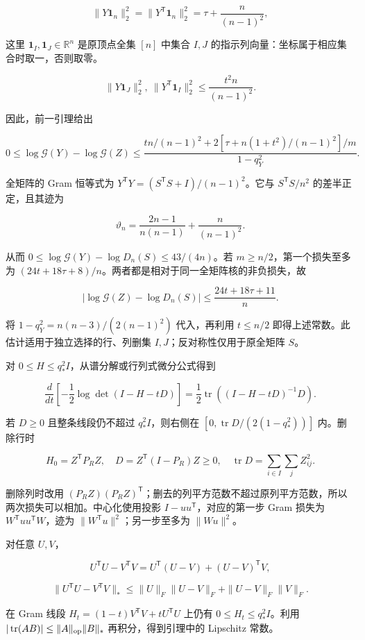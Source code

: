 \documentclass[11pt,a4paper]{article}
\begin{document}
\[
\|Y\mathbf 1_n\|_2^2=\|Y^{\mathsf T}\mathbf 1_n\|_2^2=\tau+\frac n{(n-1)^2},
\]

这里 \(\mathbf1_I,\mathbf1_J\in\mathbb R^n\) 是原顶点全集 \([n]\) 中集合 \(I,J\) 的指示列向量：坐标属于相应集合时取一，否则取零。

\[
\|Y\mathbf 1_J\|_2^2,\ \|Y^{\mathsf T}\mathbf 1_I\|_2^2\le\frac{t^2n}{(n-1)^2}.
\]

因此，前一引理给出

\[
0\le\log\mathcal G(Y)-\log\mathcal G(Z)\le\frac{t n/(n-1)^2+2[\tau+n(1+t^2)/(n-1)^2]/m}{1-q_Y^2}.
\]

全矩阵的 Gram 恒等式为 \(Y^{\mathsf T}Y=(S^{\mathsf T}S+I)/(n-1)^2\)。它与 \(S^{\mathsf T}S/n^2\) 的差半正定，且其迹为

\[
\vartheta_n=\frac{2n-1}{n(n-1)}+\frac n{(n-1)^2}.
\]

从而 \(0\le\log\mathcal G(Y)-\log D_n(S)\le43/(4n)\)。若 \(m\ge n/2\)，第一个损失至多为 \((24t+18\tau+8)/n\)。两者都是相对于同一全矩阵核的非负损失，故

\[
|\log\mathcal G(Z)-\log D_n(S)|\le\frac{24t+18\tau+11}{n}.
\]

将 \(1-q_Y^2=n(n-3)/(2(n-1)^2)\) 代入，再利用 \(t\le n/2\) 即得上述常数。此估计适用于独立选择的行、列删集 \(I,J\)；反对称性仅用于原全矩阵 \(S\)。

对 \(0\le H\le q_*^2I\)，从谱分解或行列式微分公式得到

\[
\frac{d}{dt}\left[-\frac12\log\det(I-H-tD)\right]
=\frac12\operatorname{tr}((I-H-tD)^{-1}D).
\]

若 \(D\ge0\) 且整条线段仍不超过 \(q_*^2I\)，则右侧在 \([0,\operatorname{tr}D/(2(1-q_*^2))]\) 内。删除行时

\[
H_0=Z^{\mathsf T}P_RZ,\quad
D=Z^{\mathsf T}(I-P_R)Z\ge0,\quad
\operatorname{tr}D=\sum_{i\in I}\sum_jZ_{ij}^2.
\]

删除列时改用 \((P_RZ)(P_RZ)^{\mathsf T}\)；删去的列平方范数不超过原列平方范数，所以两次损失可以相加。中心化使用投影 \(I-uu^{\mathsf T}\)，对应的第一步 Gram 损失为 \(W^{\mathsf T}uu^{\mathsf T}W\)，迹为 \(\|W^{\mathsf T}u\|^2\)；另一步至多为 \(\|Wu\|^2\)。

对任意 \(U,V\)，

\[
U^{\mathsf T}U-V^{\mathsf T}V
=U^{\mathsf T}(U-V)+(U-V)^{\mathsf T}V,
\]

\[
\|U^{\mathsf T}U-V^{\mathsf T}V\|_*
\le\|U\|_F\|U-V\|_F+\|U-V\|_F\|V\|_F.
\]

在 Gram 线段 \(H_t=(1-t)V^{\mathsf T}V+tU^{\mathsf T}U\) 上仍有 \(0\le H_t\le q_*^2I\)。利用 \(|\operatorname{tr}(AB)|\le\|A\|_{\rm op}\|B\|_*\) 再积分，得到引理中的 Lipschitz 常数。
\end{document}
